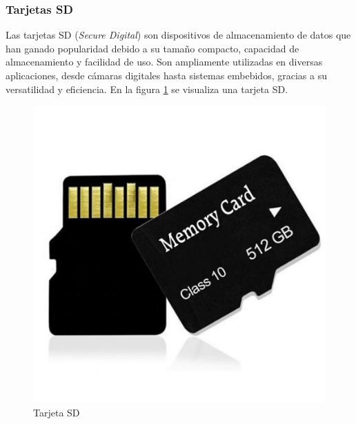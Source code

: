 \subsubsection{Tarjetas SD}

Las tarjetas SD (\textit{Secure Digital}) son dispositivos de almacenamiento de datos que han ganado popularidad debido a su tamaño compacto, capacidad de almacenamiento y facilidad de uso. Son ampliamente utilizadas en diversas aplicaciones, desde cámaras digitales hasta sistemas embebidos, gracias a su versatilidad y eficiencia. En la figura \ref{fig:sd_card} se visualiza una tarjeta SD.\\


\begin{figure}[H]
    \centering
    \includegraphics[scale = 0.2]{img/sd_card.jpg}
    \caption{Tarjeta SD}
    \label{fig:sd_card}
\end{figure}



